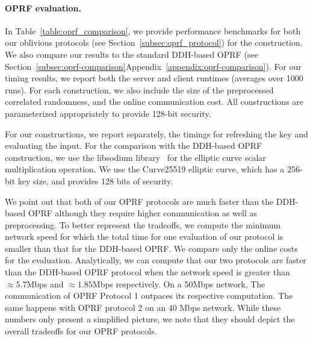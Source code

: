 \fi

\paragraph{OPRF evaluation.}
In Table~\ref{table:oprf_comparison}, we provide performance benchmarks for both our oblivious protocols (see Section~\ref{subsec:oprf_protocol}) for the \ttwPRF construction. We also compare our results to the standard DDH-based OPRF (see \iffull Section~\ref{subsec:oprf-comparison}\else Appendix~\ref{appendix:oprf-comparison}\fi). For our timing results, we report both the server and client runtimes (averages over 1000 runs). For each construction, we also include the size of the preprocessed correlated randomness, and the online communication cost. All constructions are parameterized appropriately to provide 128-bit security.

For our constructions, we report separately, the timings for refreshing the key and evaluating the input. For the comparison with the DDH-based OPRF construction, we use the libsodium library~\cite{LibSodium} for the elliptic curve scalar multiplication operation. We use the Curve25519 elliptic curve, which has a 256-bit key size, and provides 128 bits of security. 

\iffull
We point out that both of our OPRF protocols are much faster than the DDH-based OPRF although they require higher communication as well as preprocessing. To better represent the tradeoffs, we compute the minimum network speed for which the total time for one evaluation of our protocol is smaller than that for the DDH-based OPRF. We compare only the online costs for the evaluation. Analytically, we can compute that our two protocols are faster than the DDH-based OPRF protocol when the network speed is greater than $\approx 5.7$Mbps and $\approx 1.85$Mbps respectively. On a 50Mbps network, The communication of OPRF Protocol 1 outpaces its respective computation. The same happens with OPRF protocol 2 on an 40 Mbps network. While these numbers only present a simplified picture, we note that they should depict the overall tradeoffs for our OPRF protocols.
\fi


